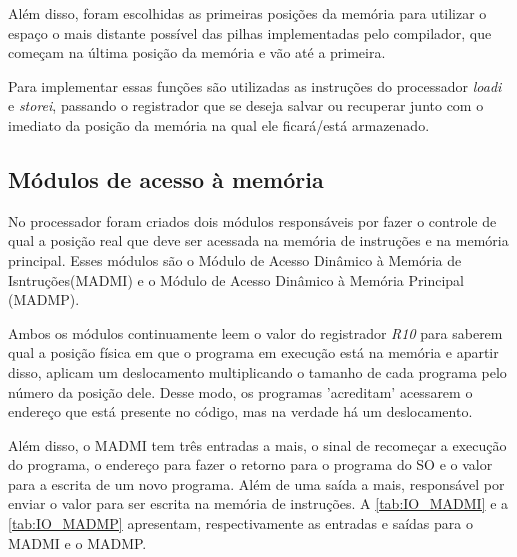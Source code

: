 \documentclass[
	12pt,				%
	oneside,
	a4paper,			%
	english,			%
	french,				%
	spanish,			%
	brazil,				%
	]{abntex2}
\begin{document}
Além disso, foram escolhidas as primeiras posições da memória para utilizar o espaço o mais distante possível das pilhas implementadas pelo compilador, que começam na última posição da memória e vão até a primeira.

Para implementar essas funções são utilizadas as instruções do processador \textit{loadi} e \textit{storei}, passando o registrador que se deseja salvar ou recuperar junto com o imediato da posição da memória na qual ele ficará/está armazenado.

\subsection{Módulos de acesso à memória}
\label{sec:Modulos_de_acesso_a_memoria}
No processador foram criados dois módulos responsáveis por fazer o controle de qual a posição real que deve ser acessada na memória de instruções e na memória principal. Esses módulos são o Módulo de Acesso Dinâmico à Memória de Isntruções(MADMI) e o Módulo de Acesso Dinâmico à Memória Principal (MADMP).

Ambos os módulos continuamente leem o valor do registrador \textit{R10} para saberem qual a posição física em que o programa em execução está na memória e apartir disso, aplicam um deslocamento multiplicando o tamanho de cada programa pelo número da posição dele. Desse modo, os programas 'acreditam' acessarem o endereço que está presente no código, mas na verdade há um deslocamento. 

Além disso, o MADMI tem três entradas a mais, o sinal de recomeçar a execução do programa, o endereço para fazer o retorno para o programa do SO e o valor para a escrita de um novo programa. Além de uma saída a mais, responsável por enviar o valor para ser escrita na memória de instruções. A \autoref{tab:IO_MADMI} e a \autoref{tab:IO_MADMP} apresentam, respectivamente as entradas e saídas para o MADMI e o MADMP.
\end{document}

